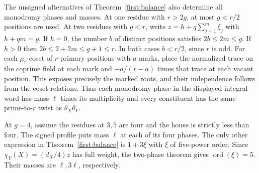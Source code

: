 \documentclass[11pt,a4paper]{article}
\numberwithin{equation}{section}
\theoremstyle{remark}
\DeclareMathOperator{\ord}{ord}
\begin{document}
The unsigned alternatives of Theorem~\ref{first:balance} also determine all
monodromy phases and masses. At one residue with $r>2g$, at most
$g<r/2$ positions are used. At two residues with $g<r$, write
$z=h+q\sum_{j=1}^m\xi_j$ with $h+qm=g$. If $h=0$, the number $b$ of
distinct positions satisfies $2b\le 2m\le g$. If $h>0$ then
$2b\le2+2m\le g+1\le r$. In both cases $b<r/2$, since $r$ is odd.
For each $\mu_r$-coset of $r$-primary positions with $a$ marks, place
the normalized trace on the coprime field at each mark and $-a/(r-a)$
times that trace at each vacant position. This exposes precisely the
marked roots, and their independence follows from the coset relations.
Thus each monodromy phase in the displayed integral word has mass
$\ell$ times its multiplicity and every constituent has the same
prime-to-$r$ twist as $\theta_X\theta_Y$.

At $g=4$, assume the residues at $3,5$ are four and the house is
strictly less than four. The signed profile puts mass $\ell$ at each
of its four phases. The only other expression in Theorem~\ref{first:balance} is
$1+3\xi$ with $\xi$ of five-power order. Since
$\chi_Y(X)=(d_X/4)z$ has full weight, the two-phase theorem gives
$\ord(\xi)=5$. Their masses are $\ell,3\ell$, respectively.
\end{document}
